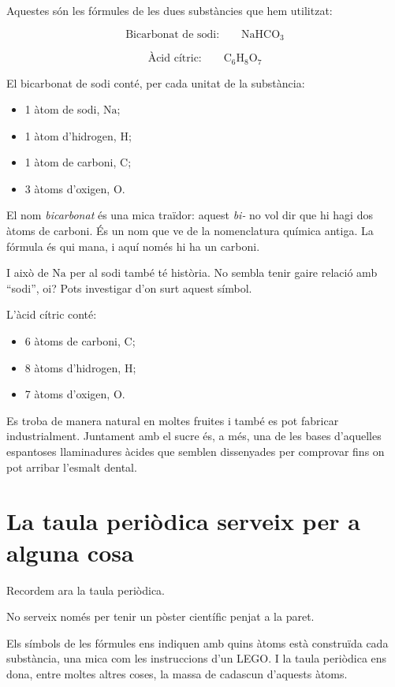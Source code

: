 
Aquestes són les fórmules de les dues substàncies que hem utilitzat:

\[
\text{Bicarbonat de sodi:}\qquad \mathrm{NaHCO_3}
\]

\[
\text{Àcid cítric:}\qquad \mathrm{C_6H_8O_7}
\]

El bicarbonat de sodi conté, per cada unitat de la substància:

\begin{itemize}
    \item 1 àtom de sodi, \(\mathrm{Na}\);
    \item 1 àtom d'hidrogen, \(\mathrm{H}\);
    \item 1 àtom de carboni, \(\mathrm{C}\);
    \item 3 àtoms d'oxigen, \(\mathrm{O}\).
\end{itemize}

El nom \emph{bicarbonat} és una mica traïdor: aquest \emph{bi-} no vol dir que hi hagi dos àtoms de carboni. És un nom que ve de la nomenclatura química antiga. La fórmula és qui mana, i aquí només hi ha un carboni.

I això de \(\mathrm{Na}\) per al sodi també té història. No sembla tenir gaire relació amb ``sodi'', oi? Pots investigar d'on surt aquest símbol.

L'àcid cítric conté:

\begin{itemize}
    \item 6 àtoms de carboni, \(\mathrm{C}\);
    \item 8 àtoms d'hidrogen, \(\mathrm{H}\);
    \item 7 àtoms d'oxigen, \(\mathrm{O}\).
\end{itemize}

Es troba de manera natural en moltes fruites i també es pot fabricar industrialment. Juntament amb el sucre és, a més, una de les bases d'aquelles espantoses llaminadures àcides que semblen dissenyades per comprovar fins on pot arribar l'esmalt dental.

\section{La taula periòdica serveix per a alguna cosa}

Recordem ara la taula periòdica.

No serveix només per tenir un pòster científic penjat a la paret.

Els símbols de les fórmules ens indiquen amb quins àtoms està construïda cada substància, una mica com les instruccions d'un LEGO. I la taula periòdica ens dona, entre moltes altres coses, la massa de cadascun d'aquests àtoms.

